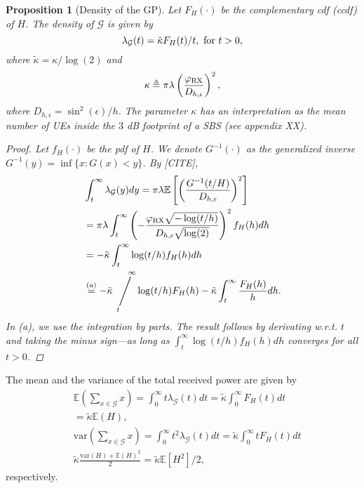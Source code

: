 \documentclass[lettersize,journal]{IEEEtran}
\newcommand{\viiva}{\mathop{\Bigg/}}
\newcommand{\sij}[3]{\viiva\limits_{\hspace*{-5mm}{#1}}^{\hspace*{5mm}{#2}}{#3}}
\newtheorem{prop}[theorem]{Proposition}
\begin{document}
\begin{prop}[Density of the GP]
  Let $F_H(\cdot)$ be the complementary cdf (ccdf) of $H$. The density of $\mathcal{G}$ is given by
  \begin{equation}
    \label{eq:GPdensity}
    \lambda_{\mathcal{G}}(t)= \tilde{\kappa}F_H(t)/t, \text{ \text{for} }t>0,
  \end{equation}
  where $\tilde{\kappa}= \kappa/\log(2)$ and
  \begin{equation}
    \label{eq:kappa}
          {\kappa} \triangleq    \pi \lambda   \left(\frac{\varphi_{\textup{RX}}}{D_{h,\epsilon}}\right)^2,
  \end{equation}
  where $D_{h,\epsilon}=\sin^2(\epsilon)/h$. The parameter $\kappa$ has an interpretation as the mean number of UEs inside the $3$ dB footprint of a SBS (see appendix XX).
  \begin{proof}
    Let $f_H(\cdot)$ be the pdf of $H$. We denote $G^{-1}(\cdot)$ as the generalized inverse $G^{-1}(y) = \inf \{x:G(x)<y\}$. By [CITE],
    \begin{align*}
      &\int_t^{\infty}\lambda_{\mathcal{G}}(y)dy \overset{}{=} \pi \lambda \mathbb{E}\left[ \left(\frac{G^{-1}(t/H)}{D_{h,\epsilon}}\right)^2 \right] \\
      &=\pi \lambda \int_t^{\infty} \left(-\frac{\varphi_{\text{RX}}\sqrt{-\log(t/h)}}{D_{h,\epsilon} \sqrt{\log(2)}}\right)^2f_H(h) dh  \\
      &= -\tilde{\kappa} \int_t^{\infty} \log(t/h)f_H(h) dh\\
      &\overset{(a)}{=} -\tilde{\kappa} \sij{t}{\infty} \log(t/h)F_H(h) - \tilde{\kappa} \int_t^{\infty}\frac{F_H(h)}{h} dh.
    \end{align*}
    In (a), we use the integration by parts. The result follows by derivating w.r.t. $t$ and taking the minus sign---as long as $\int_t^{\infty} \log(t/h)f_H(h) dh$ converges for all $t>0$.
  \end{proof}
\end{prop}

The mean and the variance of the total received power are given by
\begin{align}
  &\mathbb{E}\left(\sum_{x \in \mathcal{G}} x \right) = \int_{0}^{\infty} t\lambda_{\mathcal{G}}(t) dt = \tilde{\kappa} \int_{0}^{\infty}F_H(t) dt \nonumber \\
  &=\tilde{\kappa} \mathbb{E}(H), \\\
  &\text{var}\left(\sum_{x \in \mathcal{G}} x \right) = \int_{0}^{\infty} t^2\lambda_{\mathcal{G}}(t) dt= \tilde{\kappa} \int_0^{\infty}tF_H(t) dt  \nonumber \\
  & \tilde{\kappa} \frac{\text{var}(H) + \mathbb{E}(H)^2}{2} = \tilde{\kappa}  \mathbb{E}[H^2]/2,
\end{align}
respectively. 
\end{document}
